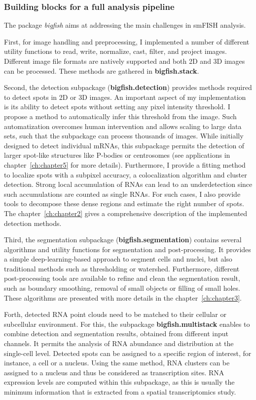 \subsubsection{Building blocks for a full analysis pipeline}

The package \emph{bigfish} aims at addressing the main challenges in \ac{smFISH} analysis.

First, for image handling and preprocessing, I implemented a number of different utility functions to read, write, normalize, cast, filter, and project images.
Different image file formats are natively supported and both 2D and 3D images can be processed.
These methods are gathered in \textbf{bigfish.stack}.

Second, the detection subpackage (\textbf{bigfish.detection}) provides methods required to detect spots in 2D or 3D images.
An important aspect of my implementation is its ability to detect spots without setting any pixel intensity threshold.
I propose a method to automatically infer this threshold from the image.
Such automatization overcomes human intervention and allows scaling to large data sets, such that the subpackage can process thousands of images.
While initially designed to detect individual \ac{mRNA}s, this subpackage permits the detection of larger spot-like structures like P-bodies or centrosomes (see applications in chapter~\ref{ch:chapter5} for more details).
Furthermore, I provide a fitting method to localize spots with a subpixel accuracy, a colocalization algorithm and cluster detection.
Strong local accumulation of \ac{RNA}s can lead to an underdetection since such accumulations are counted as single \ac{RNA}s.
For such cases, I also provide tools to decompose these dense regions and estimate the right number of spots.
The chapter~\ref{ch:chapter2} gives a comprehensive description of the implemented detection methods.

Third, the segmentation subpackage (\textbf{bigfish.segmentation}) contains several algorithms and utility functions for segmentation and post-processing.
It provides a simple deep-learning-based approach to segment cells and nuclei, but also traditional methods such as thresholding or watershed.
Furthermore, different post-processing tools are available to refine and clean the segmentation result, such as boundary smoothing, removal of small objects or filling of small holes.
These algorithms are presented with more details in the chapter~\ref{ch:chapter3}.

Forth, detected \ac{RNA} point clouds need to be matched to their cellular or subcellular environment.
For this, the subpackage \textbf{bigfish.multistack} enables to combine detection and segmentation results, obtained from different input channels.
It permits the analysis of \ac{RNA} abundance and distribution at the single-cell level.
Detected spots can be assigned to a specific region of interest, for instance, a cell or a nucleus.
Using the same method, \ac{RNA} clusters can be assigned to a nucleus and thus be considered as transcription sites.
\ac{RNA} expression levels are computed within this subpackage, as this is usually the minimum information that is extracted from a spatial transcriptomics study.

